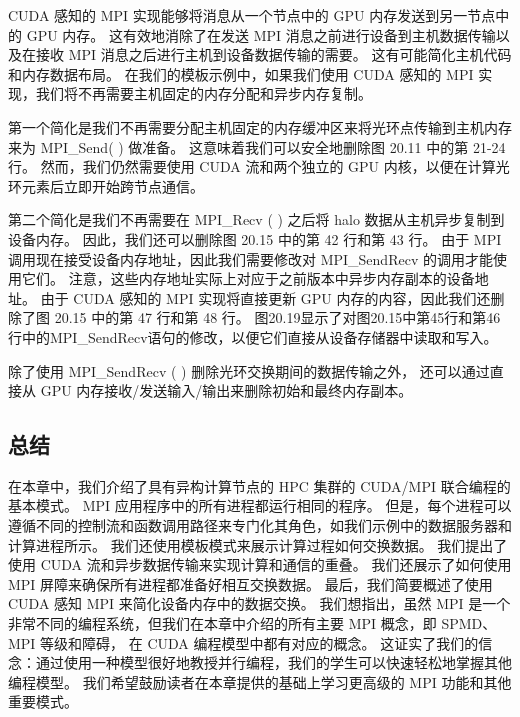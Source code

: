 CUDA 感知的 MPI 实现能够将消息从一个节点中的 GPU 内存发送到另一节点中的 GPU 内存。 
这有效地消除了在发送 MPI 消息之前进行设备到主机数据传输以及在接收 MPI 消息之后进行主机到设备数据传输的需要。 
这有可能简化主机代码和内存数据布局。 
在我们的模板示例中，如果我们使用 CUDA 感知的 MPI 实现，我们将不再需要主机固定的内存分配和异步内存复制。

第一个简化是我们不再需要分配主机固定的内存缓冲区来将光环点传输到主机内存来为 MPI\_Send( ) 做准备。 
这意味着我们可以安全地删除图 20.11 中的第 21-24 行。 
然而，我们仍然需要使用 CUDA 流和两个独立的 GPU 内核，以便在计算光环元素后立即开始跨节点通信。

第二个简化是我们不再需要在 MPI\_Recv ( ) 之后将 halo 数据从主机异步复制到设备内存。 
因此，我们还可以删除图 20.15 中的第 42 行和第 43 行。 
由于 MPI 调用现在接受设备内存地址，因此我们需要修改对 MPI\_SendRecv 的调用才能使用它们。 
注意，这些内存地址实际上对应于之前版本中异步内存副本的设备地址。 
由于 CUDA 感知的 MPI 实现将直接更新 GPU 内存的内容，因此我们还删除了图 20.15 中的第 47 行和第 48 行。 
图20.19显示了对图20.15中第45行和第46行中的MPI\_SendRecv语句的修改，以便它们直接从设备存储器中读取和写入。

除了使用 MPI\_SendRecv ( ) 删除光环交换期间的数据传输之外，
还可以通过直接从 GPU 内存接收/发送输入/输出来删除初始和最终内存副本。

\subsection{总结}
在本章中，我们介绍了具有异构计算节点的 HPC 集群的 CUDA/MPI 联合编程的基本模式。 
MPI 应用程序中的所有进程都运行相同的程序。 
但是，每个进程可以遵循不同的控制流和函数调用路径来专门化其角色，如我们示例中的数据服务器和计算进程所示。 
我们还使用模板模式来展示计算过程如何交换数据。 我们提出了使用 CUDA 流和异步数据传输来实现计算和通信的重叠。 
我们还展示了如何使用 MPI 屏障来确保所有进程都准备好相互交换数据。 
最后，我们简要概述了使用 CUDA 感知 MPI 来简化设备内存中的数据交换。 
我们想指出，虽然 MPI 是一个非常不同的编程系统，但我们在本章中介绍的所有主要 MPI 概念，即 SPMD、MPI 等级和障碍，
在 CUDA 编程模型中都有对应的概念。 
这证实了我们的信念：通过使用一种模型很好地教授并行编程，我们的学生可以快速轻松地掌握其他编程模型。 
我们希望鼓励读者在本章提供的基础上学习更高级的 MPI 功能和其他重要模式。